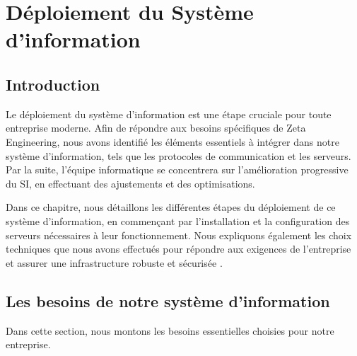 \chapter{Déploiement du Système d'information}


\section{Introduction}


Le déploiement du système d'information est une étape cruciale pour toute entreprise moderne. Afin de répondre aux besoins spécifiques de Zeta Engineering, nous avons identifié les éléments essentiels à intégrer dans notre système d'information, tels que les protocoles de communication et les serveurs. Par la suite, l'équipe informatique se concentrera sur l'amélioration progressive du SI, en effectuant des ajustements et des optimisations.


Dans ce chapitre, nous détaillons les différentes étapes du déploiement de ce système d'information, en commençant par l'installation et la configuration des serveurs nécessaires à leur fonctionnement. Nous expliquons également les choix techniques que nous avons effectués pour répondre aux exigences de l'entreprise et assurer une infrastructure robuste et sécurisée \cite{opg}.


\section{Les besoins de notre système d'information}



Dans cette section, nous montons les besoins essentielles choisies pour notre entreprise.



